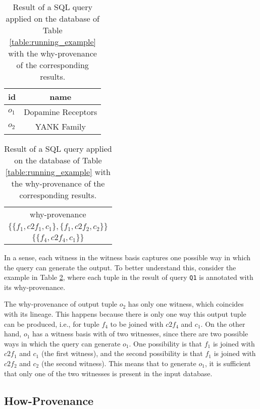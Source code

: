 \begin{table}[hbt]
\centering
  \begin{tabular}{|l|c|}
  \hline
    id & name\\
    \hline
    $o_1$ &  Dopamine Receptors\\
    $o_2$ & YANK Family\\
    \hline
  \end{tabular}
  \begin{tabular}{c}
  	why-provenance   \\
  	$\{\{f_1, c2f_1, c_1\}, \{f_1, c2f_2, c_2\}\}$ \\
  	$\{\{ f_4, c2f_4, c_1\}\}$ \\
  \end{tabular}
    \caption{Result of a SQL query applied on the database of Table \ref{table:running_example} with the why-provenance of the corresponding results.}
  \label{table:result_why_prov}
\end{table}
 
In a sense, each witness in the witness basis captures one possible way in which the query can generate the output. 
To better understand this, consider the example in Table \ref{table:result_why_prov}, where each tuple in the result of query \texttt{Q1} is annotated with its why-provenance. 

The why-provenance of output tuple $o_2$ has only one witness, which coincides with its lineage. This happens because there is only one way this output tuple can be produced, i.e., for tuple $f_4$ to be joined with $c2f_4$ and $c_1$.
On the other hand, $o_1$ has a witness basis with of two witnesses, since there are two possible ways in which the query can generate $o_1$. 
One possibility is that $f_1$ is joined with $c2f_1$ and $c_1$ (the first witness), and the second possibility is that $f_1$ is joined with $c2f_2$ and $c_2$ (the second witness). This means that to generate $o_1$, it is sufficient that only one of the two witnesses is present in the input database. 

\subsection{How-Provenance}
\label{section:how_provenance_tuples}


